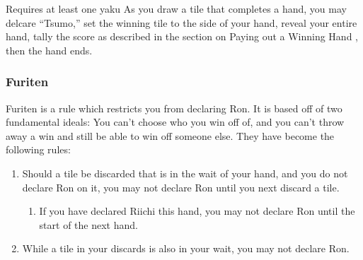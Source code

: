 	{\symbalert Requires at least one yaku }
	{As you draw a tile that completes a hand, you may delcare ``Tsumo,'' set the winning tile to the side of your hand, reveal your entire hand, tally the score as described in the section on Paying out a Winning Hand , then the hand ends.}

\subsubsection{Furiten}\label{core:sssec:furiten}

Furiten is a rule which restricts you from declaring Ron. It is based off of two fundamental ideals: You can't choose who you win off of, and you can't throw away a win and still be able to win off someone else. They have become the following rules:
\begin{enumerate}
	\item Should a tile be discarded that is in the wait of your hand, and you do not declare Ron on it, you may not declare Ron until you next discard a tile.
	\begin{enumerate}
		\item If you have declared Riichi this hand, you may not declare Ron until the start of the next hand.
	\end{enumerate}
	\item While a tile in your discards is also in your wait, you may not declare Ron.
\end{enumerate}